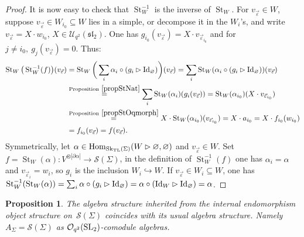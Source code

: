 \documentclass[pdftex]{sigma}%
\numberwithin{equation}{section}
\newtheorem{Proposition}[Theorem]{Proposition}
 { \theoremstyle{definition}
\newtheorem{Definition}[Theorem]{Definition}
\newtheorem{Note}[Theorem]{Note}
\newtheorem{Example}[Theorem]{Example}
\newtheorem{Remark}[Theorem]{Remark} }
\newcommand{\abss}[1]{\left\vert #1 \right\vert}
\newcommand{\St}{\operatorname{St}}
\newcommand{\Hom}{\operatorname{Hom}}
\newcommand{\Oq}{\mathcal{O}_{q^2}({\rm SL}_2)}
\newcommand{\Uq}{\mathcal{U}_{q^2}(\mathfrak{sl}_2)}
\begin{document}
\begin{proof}
It is now easy to check that $\St_W^{-1}$ is the inverse of $\St_W$. For $v_{\vec{\varepsilon}} \in W$, suppose $v_{\vec{\varepsilon}}\in W_{i_0} \subseteq W$ lies in a simple, or decompose it in the $W_i$'s, and write $v_{\vec{\varepsilon}} = X\cdot w_{i_0}$, $X \in \Uq$. One has $g_{i_0}(v_{\vec{\varepsilon}})= X\cdot v_{\vec{\varepsilon}_{i_0}}$ and for $j\neq {i_0},\ g_j(v_{\vec{\varepsilon}})=0$. Thus:
\begin{align*}
\St_W\big(\St_W^{-1}(f)\big)(v_{\vec{\varepsilon}}) &= \St_W\bigg(\sum_i \alpha_i\circ (g_i \rhd {\rm Id}_\varnothing)\bigg)(v_{\vec{\varepsilon}}) = \sum_i \St_W(\alpha_i\circ (g_i \rhd {\rm Id}_\varnothing))(v_{\vec{\varepsilon}})
\\
&\overset{{\rm Proposition~\ref{propStNat}}}{=} \sum_i \St_W(\alpha_i)(g_i(v_{\vec{\varepsilon}}))
 = \St_W(\alpha_{i_0})(X\cdot v_{\vec{\varepsilon}_{i_0}})
 \\&
\overset{{\rm Proposition~\ref{propStOqmorph}}}{=} X\cdot \St_W(\alpha_{i_0})(v_{\vec{\varepsilon}_{i_0}})= X\cdot a_{i_0}= X \cdot f_{i_0}(w_{i_0})\\
& = f_{i_0}(v_{\vec{\varepsilon}})= f(v_{\vec{\varepsilon}}).
\end{align*}
Symmetrically, let $\alpha \in \Hom_{{\rm Sk}_{{\rm TL}}(\Sigma)}(W \rhd \varnothing,\varnothing)$ and $v_{\vec{\varepsilon}} \in W$. Set $f=\St_W(\alpha)\colon V^{\otimes \abss{\partial \alpha}} \to \mathscr{S}(\Sigma)$, in the definition of $\St_W^{-1}(f)$ one has $\alpha_i = \alpha$ and $v_{\vec{\varepsilon}_i}=w_i$, so $g_i$ is the inclusion $W_i\hookrightarrow W$. If $v_{\vec{\varepsilon}} \in W_i \subseteq W$, one has $\St_W^{-1}(\St_W(\alpha))=\sum_i \alpha\circ (g_i\rhd {\rm Id}_\varnothing) = \alpha\circ ({\rm Id}_W \rhd {\rm Id}_\varnothing) = \alpha$.
\end{proof}

\begin{Proposition}\label{propProdsOnSS}
The algebra structure inherited from the internal endomorphism object structure on~$\mathscr{S}(\Sigma)$ coincides with its usual algebra structure. Namely $A_\Sigma =\mathscr{S}(\Sigma)$ as $\Oq$-comodule algebras.
\end{Proposition}
\end{document}

